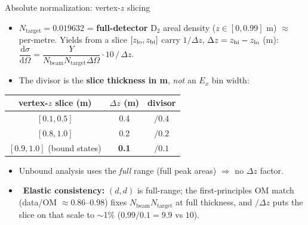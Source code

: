 \documentclass[aspectratio=169,11pt]{beamer}
\newcommand{\good}{\textcolor{green!55!black}{\textbf{\checkmark}}}
\begin{document}
\begin{frame}{Absolute normalization: vertex-$z$ slicing}
  \begin{itemize}
    \item $N_{\mathrm{target}}=0.019632$ = \textbf{full-detector} D$_2$ areal
      density ($z\!\in\![0,0.99]$ m) $\approx$ per-metre. Yields from a slice
      $[z_{\rm lo},z_{\rm hi}]$ carry $1/\Delta z$, $\Delta z=z_{\rm hi}-z_{\rm lo}$ (m):
      $\dfrac{\mathrm{d}\sigma}{\mathrm{d}\Omega} = \dfrac{Y}{N_{\mathrm{beam}} N_{\mathrm{target}} \Delta\Omega}\cdot 10\,/\,\Delta z$.
    \item The divisor is the \textbf{slice thickness in m}, \emph{not} an $E_x$
      bin width:
  \end{itemize}
  \vspace{-0.3em}
  \begin{center}\small
  \begin{tabular}{ccc}
    \toprule
    vertex-$z$ slice (m) & $\Delta z$ (m) & divisor \\
    \midrule
    $[0.1,0.5]$ & 0.4 & $/0.4$ \\
    $[0.8,1.0]$ & 0.2 & $/0.2$ \\
    $\mathbf{[0.9,1.0]}$ (bound states) & \textbf{0.1} & $\mathbf{/0.1}$ \\
    \bottomrule
  \end{tabular}
  \end{center}
  \begin{itemize}
    \item Unbound analysis uses the \emph{full} range (full peak areas)
      $\Rightarrow$ no $\Delta z$ factor.
    \item \good\ \textbf{Elastic consistency:} $(d,d)$ is full-range; the
      first-principles OM match (data/OM $\approx0.86$--$0.98$) fixes
      $N_{\mathrm{beam}}N_{\mathrm{target}}$ at full thickness, and $/\Delta z$
      puts the slice on that scale to $\sim$1\% ($0.99/0.1=9.9$ vs $10$).
  \end{itemize}
\end{frame}
\end{document}
